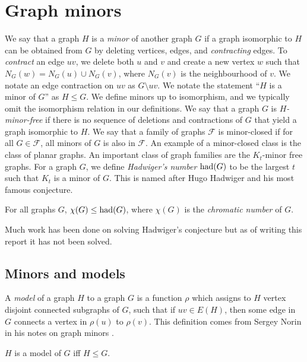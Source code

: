 \section{Graph minors}\label{sec:Graph Minors}
We say that a graph \(H\) is a \textit{minor} of another graph \(G\) if a graph isomorphic to \(H\) can be obtained from \(G\) by deleting vertices, edges, and \textit{contracting} edges. To \textit{contract} an edge \(uv\), we delete both \(u\) and \(v\) and create a new vertex \(w\) such that \(N_G(w) = N_G(u) \cup N_G(v)\), where \(N_G(v)\) is the neighbourhood of \(v\). We notate an edge contraction on \(uv\) as \(G\setminus uv\).
We notate the statement ``\(H\) is a minor of \(G\)'' as \(H \leq G\).
We define minors up to isomorphism, and we typically omit the isomorphism relation in our definitions. We say that a graph \(G\) is \textit{\(H\)-minor-free} if there is no sequence of deletions and contractions of \(G\) that yield a graph isomorphic to \(H\). We say that a family of graphs \(\mathcal{F}\) is minor-closed if for all \(G \in \mathcal{F}\), all minors of \(G\) is also in \(\mathcal{F}\).
An example of a minor-closed class is the class of planar graphs.
An important class of graph families are the \(K_t\)-minor free graphs. For a graph \(G\), we define \textit{Hadwiger's number} \(\operatorname{had}(G)\) to be the largest \(t\) such that \(K_t\) is a minor of \(G\). This is named after Hugo Hadwiger and his most famous conjecture.

\begin{conjecture}\cite{hadwigerUeberKlassifikationStreckenkomplexe1943}
	For all graphs \(G\), \(\chi(G) \leq \operatorname{had}(G)\), where \(\chi(G)\) is the \textit{chromatic number} of \(G\).
\end{conjecture}
Much work has been done on solving Hadwiger's conjecture but as of writing this report it has not been solved.
\subsection{Minors and models}
A \textit{model} of a graph \(H\) to a graph \(G\) is a function \(\rho\) which assigns to \(H\) vertex disjoint connected subgraphs of \(G\), such that if \(uv \in E(H)\), then some edge in \(G\) connects a vertex in \(\rho(u)\) to \(\rho(v)\). This definition comes from Sergey Norin in his notes on graph minors \cite{norinMath599GraphMinors2017}.

\begin{theorem}
	\(H\) is a model of \(G\) iff \( H \leq G\).
\end{theorem}

